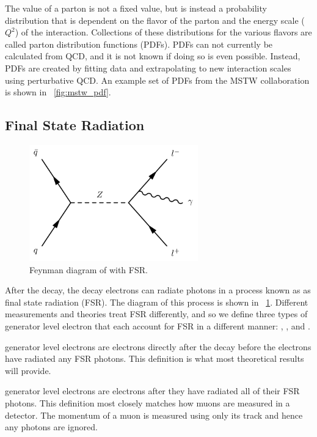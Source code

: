 The \BjorkenX value of a parton is not a fixed value, but is instead a
probability distribution that is dependent on the flavor of the parton and the
energy scale ($Q^{2}$) of the interaction. Collections of these distributions
for the various flavors are called parton distribution functions (PDFs). PDFs
can not currently be calculated from QCD, and it is not known if doing so is
even possible. Instead, PDFs are created by fitting data and extrapolating to
new interaction scales using perturbative QCD. An example set of PDFs from the
MSTW collaboration\cite{martin_2009} is shown in \FIG~\ref{fig:mstw_pdf}.



\subsection{Final State Radiation}
\label{sec:electron_dressing}

\begin{figure}[!htbp]
    \centering
    \includegraphics[width=0.65\textwidth]{figures/fsr.pdf}
    \caption{
        Feynman diagram of \Ztoll with FSR.
    }
    \label{fig:fsr_diagram}
\end{figure}

After the \Ztoee decay, the decay electrons can radiate photons in a process
known as as final state radiation (FSR). The diagram of this process is shown
in \FIG~\ref{fig:fsr_diagram}. Different measurements and theories treat FSR
differently, and so we define three types of generator level electron that each
account for FSR in a different manner: \born, \bare, and \dressed.

\Born generator level electrons are electrons directly after the \Ztoee decay
before the electrons have radiated any FSR photons. This definition is what
most theoretical results will provide.

\Bare generator level electrons are \born electrons after they have radiated all
of their FSR photons. This definition most closely matches how muons are
measured in a detector. The momentum of a muon is measured using only its track
and hence any photons are ignored.


